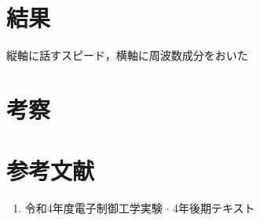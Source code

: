 \documentclass[titlepage]{jarticle}
\begin{document}
\section{結果}
縦軸に話すスピード，横軸に周波数成分をおいた


\section{考察}


\section*{参考文献}
\begin{enumerate}
  \item 令和4年度電子制御工学実験 $\cdot$ 4年後期テキスト
\end{enumerate}
\end{document}
